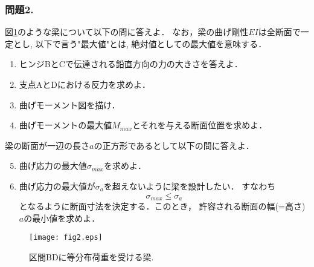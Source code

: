 \documentclass[10pt,a4j]{jarticle}
\begin{document}
\subsubsection*{問題2.}
図\ref{fig:fig2}のような梁について以下の問に答えよ．
なお，梁の曲げ剛性$EI$は全断面で一定とし, 以下で言う"最大値"とは, 
絶対値としての最大値を意味する．
\begin{enumerate}
\item
	ヒンジBとCで伝達される鉛直方向の力の大きさを答えよ．
\item
	支点AとDにおける反力を求めよ．
\item
	曲げモーメント図を描け．
\item
	曲げモーメントの最大値$M_{max}$とそれを与える断面位置を求めよ．
\end{enumerate}
梁の断面が一辺の長さ$a$の正方形であるとして以下の問に答えよ．
\begin{enumerate}
\setcounter{enumi}{4}
\item
	曲げ応力の最大値$\sigma_{max}$を求めよ．
\item
	曲げ応力の最大値が$\sigma_a$を超えないように梁を設計したい．
	すなわち
	\[
		\sigma_{max} \leq \sigma_a
	\]
	となるように断面寸法を決定する．このとき，
	許容される断面の幅(=高さ)$a$の最小値を求めよ．
\end{enumerate}
\begin{figure}[h]
	\begin{center}
	\texttt{[image: fig2.eps]} 
	\end{center}
	\caption{区間BDに等分布荷重を受ける梁.} 
	\label{fig:fig2}
\end{figure}
\end{document}
